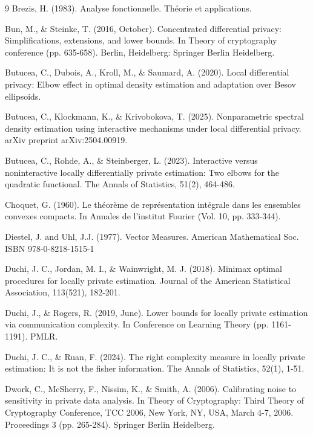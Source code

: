 \documentclass[a4paper, 11pt]{article}
\theoremstyle{definition}
\begin{document}
{\begin{thebibliography}{9}
 Brezis, H. (1983). Analyse fonctionnelle. Théorie et applications.

 Bun, M., \& Steinke, T. (2016, October). Concentrated differential privacy: Simplifications, extensions, and lower bounds. In Theory of cryptography conference (pp. 635-658). Berlin, Heidelberg: Springer Berlin Heidelberg.

 Butucea, C., Dubois, A., Kroll, M., \& Saumard, A. (2020). Local differential privacy: Elbow effect in optimal density estimation and adaptation over Besov ellipsoids.

 Butucea, C., Klockmann, K., \& Krivobokova, T. (2025). Nonparametric spectral density estimation using interactive mechanisms under local differential privacy. arXiv preprint arXiv:2504.00919.


 Butucea, C., Rohde, A., \& Steinberger, L. (2023). Interactive versus noninteractive locally differentially private estimation: Two elbows for the quadratic functional. The Annals of Statistics, 51(2), 464-486.


 Choquet, G. (1960). Le théorème de représentation intégrale dans les ensembles convexes compacts. In Annales de l'institut Fourier (Vol. 10, pp. 333-344).


 Diestel, J. and Uhl, J.J. (1977). Vector Measures. American Mathematical Soc. ISBN 978-0-8218-1515-1


 Duchi, J. C., Jordan, M. I., \& Wainwright, M. J. (2018). Minimax optimal procedures for locally private estimation. Journal of the American Statistical Association, 113(521), 182-201.

 Duchi, J., \& Rogers, R. (2019, June). Lower bounds for locally private estimation via communication complexity. In Conference on Learning Theory (pp. 1161-1191). PMLR.


 Duchi, J. C., \& Ruan, F. (2024). The right complexity measure in locally private estimation: It is not the fisher information. The Annals of Statistics, 52(1), 1-51.


 Dwork, C., McSherry, F., Nissim, K., \& Smith, A. (2006). Calibrating noise to sensitivity in private data analysis. In Theory of Cryptography: Third Theory of Cryptography Conference, TCC 2006, New York, NY, USA, March 4-7, 2006. Proceedings 3 (pp. 265-284). Springer Berlin Heidelberg.


\end{thebibliography}}
\end{document}
